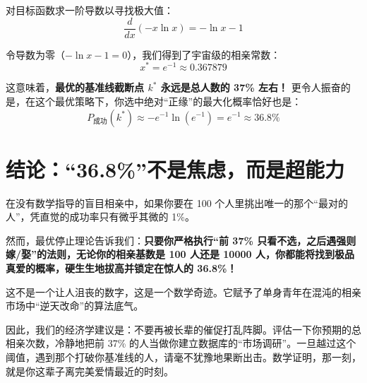\documentclass[11pt, a4paper, UTF8]{chinese-erj}
\begin{document}
对目标函数求一阶导数以寻找极大值：
\begin{equation}
    \frac{d}{dx}(-x \ln x) = -\ln x - 1
\end{equation}

令导数为零（$-\ln x - 1 = 0$），我们得到了宇宙级的相亲常数：
\begin{equation}
    x^* = e^{-1} \approx 0.367879
\end{equation}

这意味着，\textbf{最优的基准线截断点 $k^*$ 永远是总人数的 37\% 左右！}
更令人振奋的是，在这个最优策略下，你选中绝对“正缘”的最大化概率恰好也是：
\begin{equation}
    P_{\text{成功}}(k^*) \approx -e^{-1} \ln(e^{-1}) = e^{-1} \approx 36.8\%
\end{equation}

\section{结论：“36.8\%”不是焦虑，而是超能力}

在没有数学指导的盲目相亲中，如果你要在 100 个人里挑出唯一的那个“最对的人”，凭直觉的成功率只有微乎其微的 1\%。

然而，最优停止理论告诉我们：\textbf{只要你严格执行“前 37\% 只看不选，之后遇强则嫁/娶”的法则，无论你的相亲基数是 100 人还是 10000 人，你都能将找到极品真爱的概率，硬生生地拔高并锁定在惊人的 36.8\%！}

这不是一个让人沮丧的数字，这是一个数学奇迹。它赋予了单身青年在混沌的相亲市场中“逆天改命”的算法底气。

因此，我们的经济学建议是：不要再被长辈的催促打乱阵脚。评估一下你预期的总相亲次数，冷静地把前 37\% 的人当做你建立数据库的“市场调研”。一旦越过这个阈值，遇到那个打破你基准线的人，请毫不犹豫地果断出击。数学证明，那一刻，就是你这辈子离完美爱情最近的时刻。

\erjref
\printbibliography[heading=none]
\end{document}
